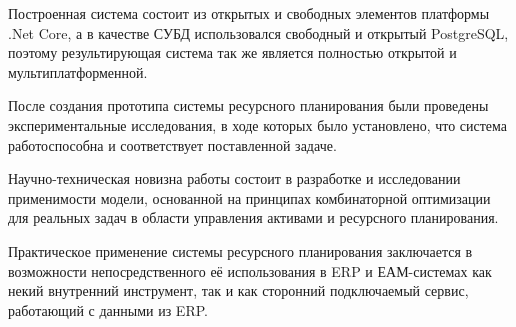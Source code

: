 Построенная система состоит из открытых и свободных элементов платформы .Net Core, а в качестве СУБД использовался свободный и открытый PostgreSQL, поэтому результирующая система так же является полностью открытой и мультиплатформенной.

После создания прототипа системы ресурсного планирования были проведены экспериментальные исследования, в ходе которых было установлено, что система работоспособна и соответствует поставленной задаче.

Научно-техническая новизна работы состоит в разработке и исследовании применимости модели, основанной на принципах комбинаторной оптимизации для реальных задач в области управления активами и ресурсного планирования.

Практическое применение системы ресурсного планирования заключается в возможности непосредственного её использования в ERP и ЕАМ-системах как некий внутренний инструмент, так и как сторонний подключаемый сервис, работающий с данными из ERP.


\clearpage
